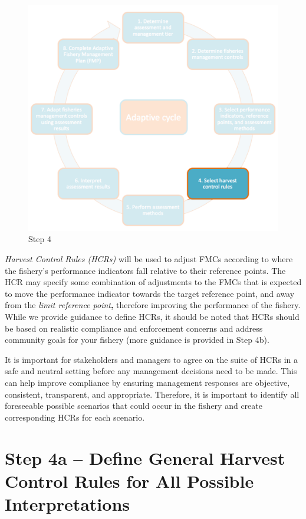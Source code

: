 \documentclass[]{book}
\begin{document}
\begin{figure}
\centering
\includegraphics{myMediaFolder/media/Step4.png}
\caption{\label{fig:Step4}Step 4}
\end{figure}

\emph{Harvest Control Rules (HCRs)} will be used to adjust FMCs
according to where the fishery's performance indicators fall relative to
their reference points. The HCR may specify some combination of
adjustments to the FMCs that is expected to move the performance
indicator towards the target reference point, and away from the
\emph{limit reference point}\textbf{,} therefore improving the
performance of the fishery. While we provide guidance to define HCRs, it
should be noted that HCRs should be based on realistic compliance and
enforcement concerns and address community goals for your fishery (more
guidance is provided in Step 4b).

It is important for stakeholders and managers to agree on the suite of
HCRs in a safe and neutral setting before any management decisions need
to be made. This can help improve compliance by ensuring management
responses are objective, consistent, transparent, and appropriate.
Therefore, it is important to identify all foreseeable possible
scenarios that could occur in the fishery and create corresponding HCRs
for each scenario.

\section{Step 4a -- Define General Harvest Control Rules for All
Possible
Interpretations}\label{step-4a-define-general-harvest-control-rules-for-all-possible-interpretations}
\end{document}
